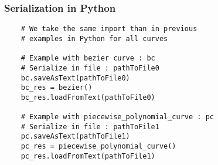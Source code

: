 \documentclass{article}
\begin{document}
    \subsubsection{Serialization in Python}
    \begin{lstlisting}
    # We take the same import than in previous
    # examples in Python for all curves

    # Example with bezier curve : bc
    # Serialize in file : pathToFile0
    bc.saveAsText(pathToFile0)
    bc_res = bezier()
    bc_res.loadFromText(pathToFile0)

    # Example with piecewise_polynomial_curve : pc
    # Serialize in file : pathToFile1
    pc.saveAsText(pathToFile1)
    pc_res = piecewise_polynomial_curve()
    pc_res.loadFromText(pathToFile1)
    \end{lstlisting}
\end{document}
